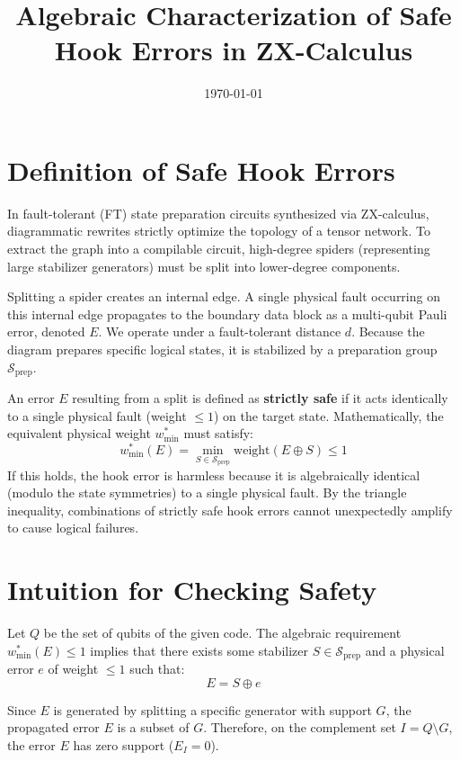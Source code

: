 \documentclass[11pt]{article}
\title{Algebraic Characterization of Safe Hook Errors in ZX-Calculus}
\author{}
\date{\today}
\begin{document}
\maketitle

\section{Definition of Safe Hook Errors}
In fault-tolerant (FT) state preparation circuits synthesized via ZX-calculus, diagrammatic rewrites strictly optimize the topology of a tensor network. To extract the graph into a compilable circuit, high-degree spiders (representing large stabilizer generators) must be split into lower-degree components.

Splitting a spider creates an internal edge. A single physical fault occurring on this internal edge propagates to the boundary data block as a multi-qubit Pauli error, denoted $E$. We operate under a fault-tolerant distance $d$. Because the diagram prepares specific logical states, it is stabilized by a preparation group $\mathcal{S}_{\text{prep}}$.

An error $E$ resulting from a split is defined as \textbf{strictly safe} if it acts identically to a single physical fault (weight $\le 1$) on the target state. Mathematically, the equivalent physical weight $w_{\text{min}}^*$ must satisfy:
\begin{equation}
    w_{\text{min}}^*(E) = \min_{S \in \mathcal{S}_{\text{prep}}} \text{weight}(E \oplus S) \le 1
\end{equation}
If this holds, the hook error is harmless because it is algebraically identical (modulo the state symmetries) to a single physical fault. By the triangle inequality, combinations of strictly safe hook errors cannot unexpectedly amplify to cause logical failures.

\section{Intuition for Checking Safety}
Let $Q$ be the set of qubits of the given code.
The algebraic requirement $w_{\text{min}}^*(E) \le 1$ implies that there exists some stabilizer $S \in \mathcal{S}_{\text{prep}}$ and a physical error $e$ of weight $\le 1$ such that:
\begin{equation}
    E = S \oplus e
\end{equation}

Since $E$ is generated by splitting a specific generator with support $G$, the propagated error $E$ is a subset of $G$.
Therefore, on the complement set $I = Q \setminus G$, the error $E$ has zero support ($E_I = 0$).
\end{document}
